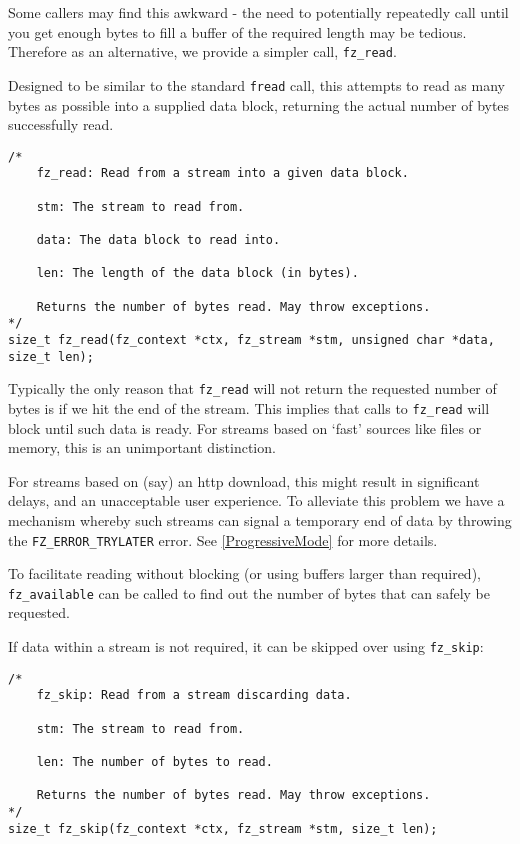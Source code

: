 \documentclass[oneside]{book}
\newcommand{\rjwref}[1] {\autoref{#1} \nameref{#1}}
\begin{document}
Some callers may find this awkward - the need to potentially repeatedly call until you get enough bytes to fill a buffer of the required length may be tedious. Therefore as an alternative, we provide a simpler call, \texttt{fz\_read}.

Designed to be similar to the standard \texttt{fread} call, this attempts to read as many bytes as possible into a supplied data block, returning the actual number of bytes successfully read.

\begin{lstlisting}
/*
	fz_read: Read from a stream into a given data block.

	stm: The stream to read from.

	data: The data block to read into.

	len: The length of the data block (in bytes).

	Returns the number of bytes read. May throw exceptions.
*/
size_t fz_read(fz_context *ctx, fz_stream *stm, unsigned char *data, size_t len);
\end{lstlisting}

Typically the only reason that \texttt{fz\_read} will not return the requested number of bytes is if we hit the end of the stream. This implies that calls to \texttt{fz\_read} will block until such data is ready. For streams based on `fast' sources like files or memory, this is an unimportant distinction.

For streams based on (say) an http download, this might result in significant delays, and an unacceptable user experience. To alleviate this problem we have a mechanism whereby such streams can signal a temporary end of data by throwing the \texttt{FZ\_ERROR\_TRYLATER} error. See \rjwref{ProgressiveMode} for more details.

To facilitate reading without blocking (or using buffers larger than required), \texttt{fz\_available} can be called to find out the number of bytes that can safely be requested.

If data within a stream is not required, it can be skipped over using \texttt{fz\_skip}:

\begin{lstlisting}
/*
	fz_skip: Read from a stream discarding data.

	stm: The stream to read from.

	len: The number of bytes to read.

	Returns the number of bytes read. May throw exceptions.
*/
size_t fz_skip(fz_context *ctx, fz_stream *stm, size_t len);
\end{lstlisting}
\end{document}
